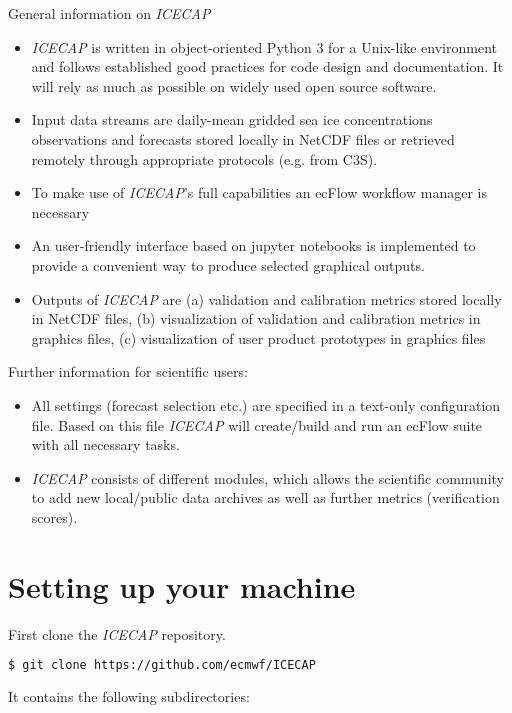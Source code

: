 \documentclass[DIV=10, parskip=full]{scrreprt}
\newcommand{\ice}{\textit{ICECAP}\xspace}
\begin{document}
General information on \ice
\begin{itemize}
	\item \ice is written in object-oriented Python 3 for a Unix-like environment and follows established good practices for code design and documentation. It will rely as much as possible on widely used open source software.
	\item Input data streams are daily-mean gridded sea ice concentrations observations and forecasts stored locally in NetCDF files or retrieved remotely through appropriate protocols (e.g. from C3S).
	\item To make use of \ice's full capabilities an ecFlow workflow manager is necessary
	\item An user-friendly interface based on jupyter notebooks is implemented to provide a convenient way to
	 produce selected graphical outputs. 
	\item Outputs of \ice are (a) validation and calibration metrics stored locally in NetCDF files, (b) visualization of validation and calibration metrics in graphics files, (c) visualization of user product prototypes in graphics files
\end{itemize}

Further information for scientific users:
\begin{itemize}
	\item All settings (forecast selection etc.) are specified in a text-only configuration file. Based on this file \ice will create/build and run an ecFlow suite  with all necessary tasks.
	\item \ice consists of different modules, which allows the scientific community to add new local/public data archives as well as further metrics (verification scores).
\end{itemize}



\FloatBarrier
\section{Setting up your machine}\label{sec:setup}
First clone the \ice repository.
\begin{lstlisting}[language=bash]
	$ git clone https://github.com/ecmwf/ICECAP
\end{lstlisting}


It contains the following subdirectories:

\end{document}
